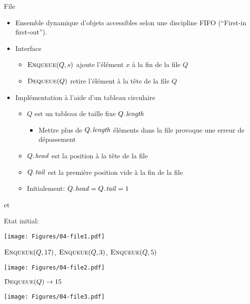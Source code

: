 \begin{frame}{File}
\begin{itemize}
\item Ensemble dynamique d'objets accessibles selon une discipline \alert{FIFO} (``First-in first-out'').
\item Interface
\begin{itemize}
\item $\textnormal{\scshape Enqueue}(Q,s)$ ajoute l'élément $x$ à la fin de la file $Q$
\item $\textnormal{\scshape Dequeue}(Q)$  retire l'élément à la tête de la file $Q$
\end{itemize}

\bigskip

\item Implémentation à l'aide d'un tableau circulaire
\begin{itemize}
\item $Q$ est un tableau de taille fixe $\attrib{Q}{length}$
\begin{itemize}
\item Mettre plus de $\attrib{Q}{length}$ éléments dans la file provoque une erreur de dépassement
\end{itemize}
\item $\attrib{Q}{head}$  est la position à la tête de la file
\item $\attrib{Q}{tail}$ est la première position vide à la fin de la file
\item Initialement: $\attrib{Q}{head}=\attrib{Q}{tail}=1$
\end{itemize}
\end{itemize}
\end{frame}

\begin{frame}{ et }
\begin{small}
Etat initial:
\bigskip
\centerline{\texttt{[image: Figures/04-file1.pdf]}}
$\textnormal{\scshape Enqueue}(Q,17)$, $\textnormal{\scshape Enqueue}(Q,3)$, $\textnormal{\scshape Enqueue}(Q,5)$
\bigskip
\centerline{\texttt{[image: Figures/04-file2.pdf]}}
$\textnormal{\scshape Dequeue}(Q) \rightarrow 15$
\bigskip
\centerline{\texttt{[image: Figures/04-file3.pdf]}}
\end{small}
\end{frame}

